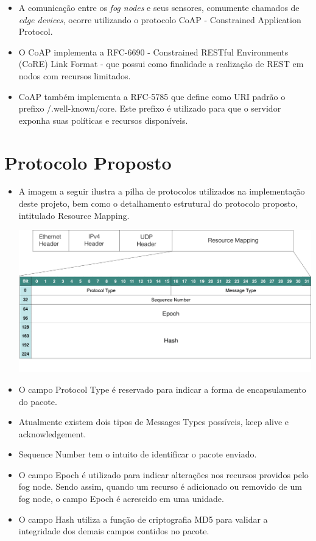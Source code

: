\documentclass[a0,portrait]{lab-poster}
\begin{document}
\begin{multicols}{2}
\begin{itemize}
\item A comunicação entre os \textit{fog nodes} e seus sensores, comumente chamados de \textit{edge devices}, ocorre utilizando o protocolo CoAP - Constrained Application Protocol.
\item O CoAP implementa a RFC-6690 - Constrained RESTful Environments (CoRE) Link Format - que possui como finalidade a realização de REST em nodos com recursos limitados\cite{rfc6690}.
\item CoAP também implementa a RFC-5785 que define como URI padrão o prefixo /.well-known/core. Este prefixo é utilizado para que o servidor exponha suas políticas e recursos disponíveis\cite{rfc5785}.

\end{itemize}

\section*{\huge Protocolo Proposto}

\Large
\justifying
\begin{itemize}

\item A imagem a seguir ilustra a pilha de protocolos utilizados na implementação deste projeto, bem como o detalhamento estrutural do protocolo proposto, intitulado Resource Mapping.


\begin{center}
\includegraphics[width=0.9\linewidth]{fig/fig2.png}
\end{center}

\item O campo Protocol Type é reservado para indicar a forma de encapsulamento do pacote.
\item Atualmente existem dois tipos de Messages Types possíveis, keep alive e acknowledgement.
\item Sequence Number tem o intuito de identificar o pacote enviado.
\item O campo Epoch é utilizado para indicar alterações nos recursos providos pelo fog node.
Sendo assim, quando um recurso é adicionado ou removido de um fog node, o campo Epoch é acrescido em uma unidade.
\item O campo Hash utiliza a função de criptografia MD5 para validar a integridade dos demais campos contidos no pacote.
\end{itemize}




\end{multicols}
\end{document}
